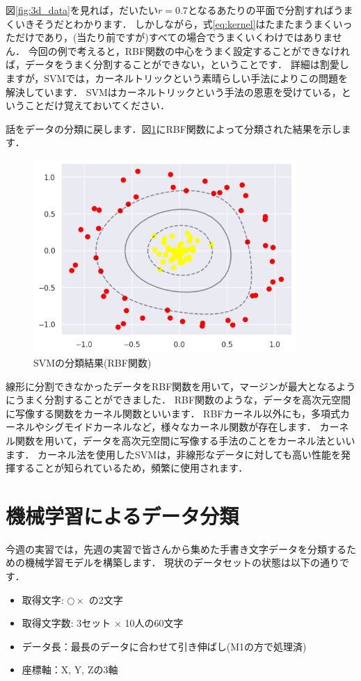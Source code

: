 \documentclass{jarticle}
\begin{document}
図\ref{fig:3d_data}を見れば，だいたい$r=0.7$となるあたりの平面で分割すればうまくいきそうだとわかります．
しかしながら，式\ref{eq:kernel}はたまたまうまくいっただけであり，(当たり前ですが)すべての場合でうまくいくわけではありません．
今回の例で考えると，RBF関数の中心をうまく設定することができなければ，データをうまく分割することができない，ということです．
詳細は割愛しますが，SVMでは，カーネルトリックという素晴らしい手法によりこの問題を解決しています．
SVMはカーネルトリックという手法の恩恵を受けている，ということだけ覚えておいてください．

話をデータの分類に戻します．図\ref{fig:svm_RBF}にRBF関数によって分類された結果を示します．

\begin{figure}[H]
  \centering
  \includegraphics[width=10cm]{fig/svm_rbf_db.png}
  \caption{SVMの分類結果(RBF関数)}
  \label{fig:svm_RBF}
\end{figure}

線形に分割できなかったデータをRBF関数を用いて，マージンが最大となるようにうまく分割することができました．
RBF関数のような，データを高次元空間に写像する関数をカーネル関数といいます．
RBFカーネル以外にも，多項式カーネルやシグモイドカーネルなど，様々なカーネル関数が存在します．
カーネル関数を用いて，データを高次元空間に写像する手法のことをカーネル法といいます．
カーネル法を使用したSVMは，非線形なデータに対しても高い性能を発揮することが知られているため，頻繁に使用されます．

\section{機械学習によるデータ分類}
今週の実習では，先週の実習で皆さんから集めた手書き文字データを分類するための機械学習モデルを構築します．
現状のデータセットの状態は以下の通りです．

\begin{itemize}
  \item 取得文字: $ \bigcirc  \times $ の2文字
  \item 取得文字数: 3セット $ \times $ 10人の60文字
  \item データ長：最長のデータに合わせて引き伸ばし(M1の方で処理済)
  \item 座標軸：X, Y, Zの3軸
\end{itemize}
\end{document}
